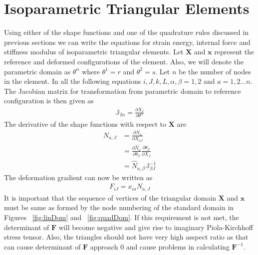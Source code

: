 \documentclass[../main.tex]{subfiles}
\begin{document}
\section{Isoparametric Triangular Elements}
Using either of the shape functions and one of the quadrature rules
discussed in previous sections we can write the equations for strain
energy, internal force and stiffness modulus of isoparametric
triangular elements.  Let $\mathbf{X}$ and $\mathbf{x}$ represent the
reference and deformed configurations of the element. Also, we will
denote the parametric domain as $\theta^\alpha$ where $\theta^1 = r$
and $\theta^2=s$. Let $n$ be the number of nodes in the element. In
all the following equations $i,J,k,L,\alpha,\beta = 1,2$ and
$a=1,2\ldots n$. The Jacobian matrix for transformation from
parametric domain to reference configuration is then given as
\begin{align*}
  \mathbb{J}_{I\alpha} = \frac{\partial X_{I}}{\partial\theta^{\alpha}}
\end{align*}
The derivative of the shape functions with respect to $\mathbf{X}$ are
\begin{align*}
  N_{a,J} &= \frac{\partial N_a}{\partial X_{aJ}}\\
          &= \frac{\partial\hat{N}_a}{\partial\theta_{\beta}}\frac{\partial\theta_{\beta}}{\partial X_{J}}\\
          &= \hat{N}_{a,\beta}\mathbb{J}^{-1}_{\beta J}
\end{align*}
The deformation gradient can now be written as
\begin{align*}
  F_{iJ} = x_{ia}N_{a,J}
\end{align*}
It is important that the sequence of vertices of the triangular domain
$\mathbf{X}$ and $\mathbf{x}$ must be same as formed by the node
numbering of the standard domain in Figures ~\ref{fig:linDom} and
~\ref{fig:quadDom}. If this requirement is not met, the determinant of
$\mathbf{F}$ will become negative and give rise to imaginary
Piola-Kirchhoff stress tensor. Also, the triangles should not have
very high asspect ratio as that can cause determinant of $\mathbf{F}$
approach $0$ and cause problems in calculating $\mathbf{F}^{-1}$.
\end{document}
